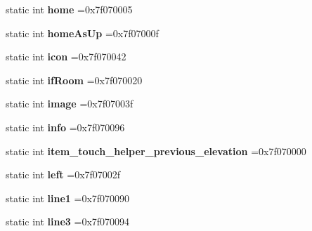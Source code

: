 \begin{DoxyCompactItemize}
static int {\bfseries home} =0x7f070005
\item 
\mbox{\label{classandroid_1_1support_1_1v4_1_1R_1_1id_ab733c4f0ad584a3e18f331d9b2ae24a4}} 
static int {\bfseries home\+As\+Up} =0x7f07000f
\item 
\mbox{\label{classandroid_1_1support_1_1v4_1_1R_1_1id_aaf59ee9a05367ddd937057a3dc0229b9}} 
static int {\bfseries icon} =0x7f070042
\item 
\mbox{\label{classandroid_1_1support_1_1v4_1_1R_1_1id_a039036679d9a53b988f3baecbcf42154}} 
static int {\bfseries if\+Room} =0x7f070020
\item 
\mbox{\label{classandroid_1_1support_1_1v4_1_1R_1_1id_abafc03d9e62bfb758efa7dde18baf7e2}} 
static int {\bfseries image} =0x7f07003f
\item 
\mbox{\label{classandroid_1_1support_1_1v4_1_1R_1_1id_a5969bc670584e6aa7e0cc92bed8c0330}} 
static int {\bfseries info} =0x7f070096
\item 
\mbox{\label{classandroid_1_1support_1_1v4_1_1R_1_1id_a7f09f500b7264fc637e5f987a1d77e42}} 
static int {\bfseries item\+\_\+touch\+\_\+helper\+\_\+previous\+\_\+elevation} =0x7f070000
\item 
\mbox{\label{classandroid_1_1support_1_1v4_1_1R_1_1id_a397daf6dc9d344794455457c224c751a}} 
static int {\bfseries left} =0x7f07002f
\item 
\mbox{\label{classandroid_1_1support_1_1v4_1_1R_1_1id_a6335074a27ca102bf01de45956672b27}} 
static int {\bfseries line1} =0x7f070090
\item 
\mbox{\label{classandroid_1_1support_1_1v4_1_1R_1_1id_ad7fd943522b00651b5c32ea8db54711e}} 
static int {\bfseries line3} =0x7f070094
\item 
\mbox{\label{classandroid_1_1support_1_1v4_1_1R_1_1id_a88604fee5ff6927300a18896ca68d75a}} 

\end{DoxyCompactItemize}
